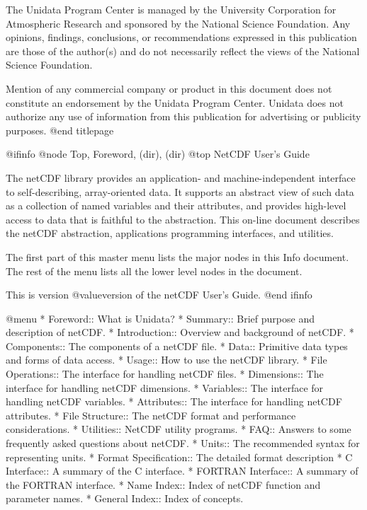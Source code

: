 The Unidata Program Center is managed by the University
Corporation for Atmospheric Research and sponsored by the National
Science Foundation.  Any opinions, findings, conclusions, or
recommendations expressed in this publication are those of the
author(s) and do not necessarily reflect the views of the National
Science Foundation.

Mention of any commercial company or product in this document
does not constitute an endorsement by the Unidata Program Center.
Unidata does not authorize any use of information from this
publication for advertising or publicity purposes.
@end titlepage

@ifinfo
@node Top, Foreword, (dir), (dir)
@top NetCDF User's Guide

The netCDF library provides an application- and
machine-independent interface to self-describing,
array-oriented data.  It supports an abstract view of such data as a
collection of named variables and their attributes, and provides
high-level access to data that is faithful to the abstraction.  This
on-line document describes the netCDF abstraction, applications programming
interfaces, and utilities.

The first part of this master menu lists the major nodes in this Info
document.  The rest of the menu lists all the lower level nodes in the
document.

This is version @value{version} of the netCDF User's Guide.
@end ifinfo

@menu
* Foreword::                    What is Unidata?
* Summary::                     Brief purpose and description of netCDF.
* Introduction::                Overview and background of netCDF.
* Components::                  The components of a netCDF file.
* Data::                        Primitive data types and forms of data access.
* Usage::                       How to use the netCDF library.
* File Operations::             The interface for handling netCDF files.
* Dimensions::                  The interface for handling netCDF dimensions.
* Variables::                   The interface for handling netCDF variables.
* Attributes::                  The interface for handling netCDF attributes.
* File Structure::              The netCDF format and performance considerations.
* Utilities::                   NetCDF utility programs.
* FAQ::                         Answers to some frequently asked questions about netCDF.
* Units::                       The recommended syntax for representing units.
* Format Specification::        The detailed format description
* C Interface::                 A summary of the C interface.
* FORTRAN Interface::           A summary of the FORTRAN interface.
* Name Index::                  Index of netCDF function and parameter names.
* General Index::               Index of concepts.

